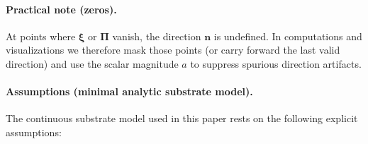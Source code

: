 \paragraph{Practical note (zeros).}
At points where $\boldsymbol\xi$ or $\boldsymbol\Pi$ vanish, the direction
$\mathbf n$ is undefined. In computations and visualizations we therefore mask
those points (or carry forward the last valid direction) and use the scalar
magnitude $a$ to suppress spurious direction artifacts.

\paragraph{Assumptions (minimal analytic substrate model).}
The continuous substrate model used in this paper rests on the following explicit assumptions:

